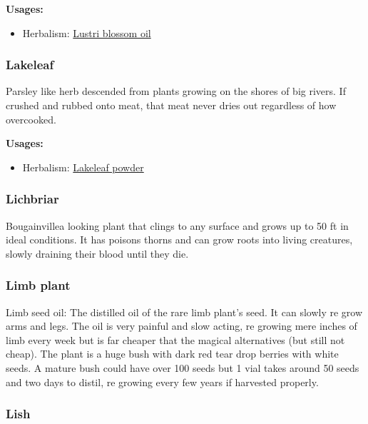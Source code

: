 \textbf{Usages:}

\begin{itemize}[noitemsep]
\item[] Herbalism: \hyperref[Lustri blossom oil]{Lustri blossom oil}
\end{itemize}

\subsubsection{Lakeleaf}
\label{Lakeleaf}

Parsley like herb descended from plants growing on the shores of big rivers. If crushed and rubbed onto meat, that meat never dries out regardless of how overcooked.

\vspace{5mm}

\textbf{Usages:}

\begin{itemize}[noitemsep]
\item[] Herbalism: \hyperref[Lakeleaf powder]{Lakeleaf powder}
\end{itemize}

\subsubsection{Lichbriar}
\label{Lichbriar}

Bougainvillea looking plant that clings to any surface and grows up to 50 ft in ideal conditions. It has poisons thorns and can grow roots into living creatures, slowly draining their blood until they die. 

\subsubsection{Limb plant}
\label{limb_plant}

Limb seed oil: The distilled oil of the rare limb plant's seed. It can slowly re grow arms and legs. The oil is very painful and slow acting, re growing mere inches of limb every week but is far cheaper that the magical alternatives (but still not cheap). The plant is a huge bush with dark red tear drop berries with white seeds. A mature bush could have over 100 seeds but 1 vial takes around 50 seeds and two days to distil, re growing every few years if harvested properly.

\subsubsection{Lish}
\label{Lish}

